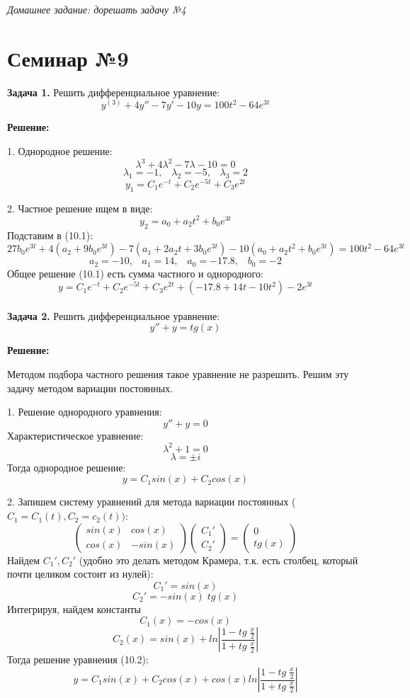 \documentclass[10pt]{report}
\begin{document}
\textit{Домашнее задание: дорешать задачу №4}

\chapter[{Семинар №9}]{Семинар №9}
\thispagestyle{empty}

\textbf{Задача 1.} Решить дифференциальное уравнение: 
\begin{equation}
y^{(3)}+4y''-7y'-10y=100t^2-64e^{3t}
\end{equation}

\textbf{Решение:} \par
1. Однородное решение:
\[\lambda^3+4\lambda^2-7\lambda-10=0\]
\[\lambda_1=-1, \;\;\; \lambda_2=-5, \;\;\;\lambda_3=2\]
\[y_1=C_1e^{-t}+C_2e^{-5t}+C_3e^{2t}\]

2. Частное решение ищем в  виде:
\[y_2=a_0+a_2t^2+b_0e^{3t}\]
Подставим в (10.1):
\[27b_0e^{3t}+4(a_2+9b_0e^{3t})-7(a_1+2a_2t+3b_0e^{3t})-10(a_0+a_2t^2+b_0e^{3t})=100t^2-64e^{3t}\]
\[a_2=-10, \;\;\; a_1=14, \;\;\; a_0=-17.8, \;\;\; b_0=-2\]
Общее решение (10.1) есть сумма частного и однородного:
\[y=C_1e^{-t}+C_2e^{-5t}+C_3e^{2t}+(-17.8+14t-10t^2)-2e^{3t}\]\\

\textbf{Задача 2.} Решить дифференциальное уравнение: 
\begin{equation}
y''+y=tg(x)
\end{equation}

\textbf{Решение:} \par
Методом подбора частного решения такое уравнение не разрешить. Решим эту задачу методом вариации постоянных. 

1. Решение однородного уравнения:
\[y''+y=0\]
Характеристическое уравнение:
\[\lambda^2+1=0\]
\[\lambda=\pm i\]
Тогда однородное решение:
\[y=C_1sin(x)+C_2cos(x)\]

2. Запишем систему уравнений для метода вариации постоянных ($C_1=C_1(t), C_2=c_2(t)):$
\[ \left(
\begin{array}{cc}
sin(x) & cos(x)  \\
cos(x) & -sin(x)
\end{array}
\right)
 \left(
\begin{array}{c}
C_1'  \\
C_2'
\end{array}
\right)=
 \left(
\begin{array}{c}
0  \\
tg(x)
\end{array}
\right)\]
Найдем $C_1', C_2'$ (удобно это делать методом Крамера, т.к. есть столбец, который почти целиком состоит из нулей):
\[C_1'=sin(x)\]
\[C_2'=-sin(x)\;tg(x)\]
Интегрируя, найдем константы
\[C_1(x)=-cos(x)\]
\[C_2(x)=sin(x)+ ln\left| \frac {1-tg\;  \frac x 2} {1+tg\;  \frac x 2} \right|\]
Тогда решение уравнения (10.2):
\[y=C_1sin(x)+C_2cos(x)+cos(x) ln\left| \frac {1-tg\;  \frac x 2} {1+tg\;  \frac x 2} \right|\]
\end{document}
